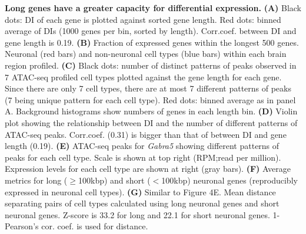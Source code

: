 \textbf{Long genes have a greater capacity for differential expression.}
\textbf{(A)} Black dots: DI of each gene is plotted against sorted gene length. Red dots: binned average of DIs (1000 genes per bin, sorted by length). Corr.coef. between DI and gene length is 0.19. 
\textbf{(B)} Fraction of expressed genes within the longest 500 genes. Neuronal (red bars) and non-neuronal cell types (blue bars) within each brain region profiled.
\textbf{(C)} Black dots: number of distinct patterns of peaks observed in 7 ATAC-seq profiled cell types plotted against the gene length for each gene. Since there are only 7 cell types, there are at most 7 different patterns of peaks (7 being unique pattern for each cell type). Red dots: binned average as in panel A. Background histograms show numbers of genes in each length bin. 
\textbf{(D)} Violin plot showing the relationship between DI and the number of different patterns of ATAC-seq peaks. Corr.coef. (0.31) is bigger than that of between DI and gene length (0.19).
\textbf{(E)} ATAC-seq peaks for \textit{Gabra5} showing different patterns of peaks for each cell type. Scale is shown at top right (RPM;read per million).  Expression levels for each cell type are shown at right (gray bars).
\textbf{(F)} Average metrics for long ($\geq$100kbp) and short ($<$100kbp) neuronal genes (reproducibly expressed in neuronal cell types). 
\textbf{(G)} Similar to Figure 4E. Mean distance separating pairs of cell types calculated using long neuronal genes and short neuronal genes. Z-score is 33.2 for long and 22.1 for short neuronal genes. 1-Pearson's cor. coef. is used for distance.
